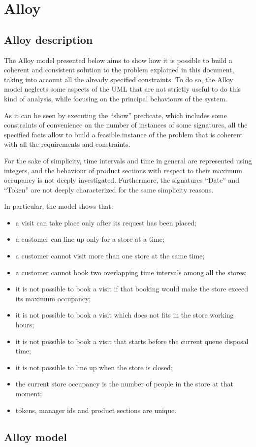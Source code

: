 \documentclass[a4paper,oneside,11pt]{book}   %
\begin{document}
\chapter{Alloy}
    \section{Alloy description}
    The Alloy model presented below aims to show how it is possible to build a coherent and consistent solution to the problem explained in this document, taking into account all the already specified constraints. To do so, the Alloy model neglects some aspects of the UML that are not strictly useful to do this kind of analysis, while focusing on the principal behaviours of the system. \par
    As it can be seen by executing the “show” predicate, which includes some constraints of convenience on the number of instances of some signatures, all the specified facts allow to build a feasible instance of the problem that is coherent with all the requirements and constraints. \par
    For the sake of simplicity, time intervals and time in general are represented using integers, and the behaviour of product sections with respect to their maximum occupancy is not deeply investigated. Furthermore, the signatures “Date” and “Token” are not deeply characterized for the same simplicity reasons. \par
    In particular, the model shows that:
    \begin{itemize}
        \item a visit can take place only after its request has been placed;
        \item a customer can line-up only for a store at a time;
        \item a customer cannot visit more than one store at the same time;
        \item a customer cannot book two overlapping time intervals among all the stores;
        \item it is not possible to book a visit if that booking would make the store exceed its maximum occupancy;
        \item it is not possible to book a visit which does not fits in the store working hours;
        \item it is not possible to book a visit that starts before the current queue disposal time;
        \item it is not possible to line up when the store is closed;
        \item the current store occupancy is the number of people in the store at that moment;
        \item tokens, manager ids and product sections are unique.
    \end{itemize}

    \section{Alloy model}
    
    \newpage
\listoftables
\listoffigures
\end{document}
